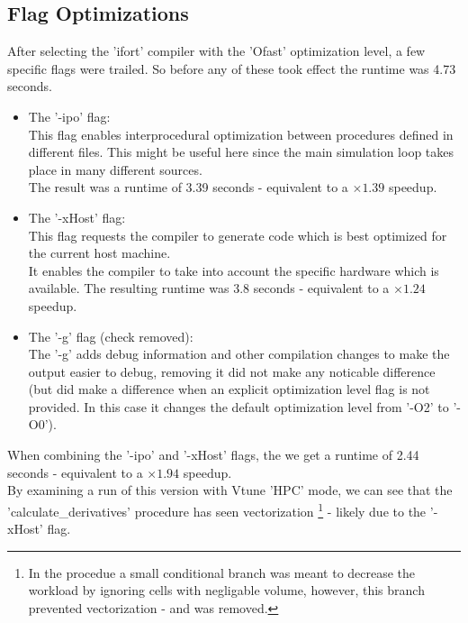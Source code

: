 \subsection*{Flag Optimizations}
After selecting the 'ifort' compiler with the 'Ofast' optimization level,
a few specific flags were trailed. So before any of these took effect
the runtime was 4.73 seconds.\\
\begin{itemize}
    \item The '-ipo' flag:\\
    This flag enables interprocedural optimization between
    procedures defined in different files. This might be useful here since the main simulation
    loop takes place in many different sources.\\
    The result was a runtime of 3.39 seconds - equivalent to a $\times 1.39$ speedup.
    
    \item The '-xHost' flag:\\
    This flag requests the compiler to generate code which
    is best optimized for the current host machine.\\
    It enables the compiler to take into account the specific
    hardware which is available.
    The resulting runtime was 3.8 seconds - equivalent to a $\times 1.24$ speedup.\\
    
    \item The '-g' flag (check removed):\\
    The '-g' adds debug information and other compilation changes to make the output easier to debug, 
    removing it did not make any noticable difference (but did make a difference when an explicit
    optimization level flag is not provided. In this case it changes the default optimization level from '-O2' to '-O0').
\end{itemize}
When combining the '-ipo' and '-xHost' flags,
the we get a runtime of 2.44 seconds - equivalent to a $\times 1.94$ speedup.\\

By examining a run of this version with Vtune 'HPC' mode,
we can see that the 'calculate\_derivatives' procedure
has seen vectorization
\footnote{
    In the procedue a small conditional branch was meant to
    decrease the workload by ignoring cells with negligable volume,
    however, this branch prevented vectorization - and was removed.
}
- likely due to the '-xHost' flag.\\
